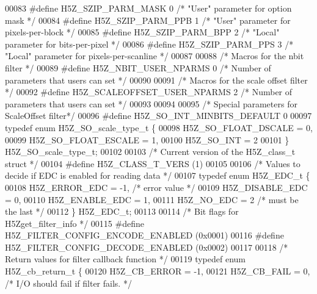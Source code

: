 \begin{DoxyCode}
00083 \textcolor{preprocessor}{#define H5Z\_SZIP\_PARM\_MASK      0       }\textcolor{comment}{/* "User" parameter for option mask */}\textcolor{preprocessor}{}
00084 \textcolor{preprocessor}{#define H5Z\_SZIP\_PARM\_PPB       1       }\textcolor{comment}{/* "User" parameter for pixels-per-block */}\textcolor{preprocessor}{}
00085 \textcolor{preprocessor}{#define H5Z\_SZIP\_PARM\_BPP       2       }\textcolor{comment}{/* "Local" parameter for bits-per-pixel */}\textcolor{preprocessor}{}
00086 \textcolor{preprocessor}{#define H5Z\_SZIP\_PARM\_PPS       3       }\textcolor{comment}{/* "Local" parameter for pixels-per-scanline */}\textcolor{preprocessor}{}
00087 
00088 \textcolor{comment}{/* Macros for the nbit filter */}
00089 \textcolor{preprocessor}{#define H5Z\_NBIT\_USER\_NPARMS     0     }\textcolor{comment}{/* Number of parameters that users can set */}\textcolor{preprocessor}{}
00090 
00091 \textcolor{comment}{/* Macros for the scale offset filter */}
00092 \textcolor{preprocessor}{#define H5Z\_SCALEOFFSET\_USER\_NPARMS      2    }\textcolor{comment}{/* Number of parameters that users can set */}\textcolor{preprocessor}{}
00093 
00094 
00095 \textcolor{comment}{/* Special parameters for ScaleOffset filter*/}
00096 \textcolor{preprocessor}{#define H5Z\_SO\_INT\_MINBITS\_DEFAULT 0}
00097 \textcolor{keyword}{typedef} \textcolor{keyword}{enum} H5Z\_SO\_scale\_type\_t \{
00098     H5Z\_SO\_FLOAT\_DSCALE = 0,
00099     H5Z\_SO\_FLOAT\_ESCALE = 1,
00100     H5Z\_SO\_INT          = 2
00101 \} H5Z\_SO\_scale\_type\_t;
00102 
00103 \textcolor{comment}{/* Current version of the H5Z\_class\_t struct */}
00104 \textcolor{preprocessor}{#define H5Z\_CLASS\_T\_VERS (1)}
00105 
00106 \textcolor{comment}{/* Values to decide if EDC is enabled for reading data */}
00107 \textcolor{keyword}{typedef} \textcolor{keyword}{enum} H5Z\_EDC\_t \{
00108     H5Z\_ERROR\_EDC       = -1,   \textcolor{comment}{/* error value */}
00109     H5Z\_DISABLE\_EDC     = 0,
00110     H5Z\_ENABLE\_EDC      = 1,
00111     H5Z\_NO\_EDC          = 2     \textcolor{comment}{/* must be the last */}
00112 \} H5Z\_EDC\_t;
00113 
00114 \textcolor{comment}{/* Bit flags for H5Zget\_filter\_info */}
00115 \textcolor{preprocessor}{#define H5Z\_FILTER\_CONFIG\_ENCODE\_ENABLED (0x0001)}
00116 \textcolor{preprocessor}{#define H5Z\_FILTER\_CONFIG\_DECODE\_ENABLED (0x0002)}
00117 
00118 \textcolor{comment}{/* Return values for filter callback function */}
00119 \textcolor{keyword}{typedef} \textcolor{keyword}{enum} H5Z\_cb\_return\_t \{
00120     H5Z\_CB\_ERROR  = -1,
00121     H5Z\_CB\_FAIL   = 0,    \textcolor{comment}{/* I/O should fail if filter fails. */}

\end{DoxyCode}
